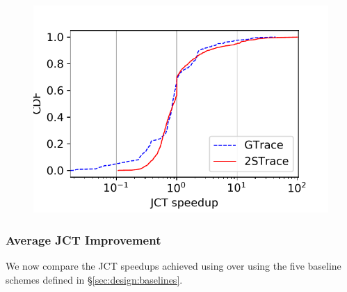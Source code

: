 \begin{figure}
\includegraphics[width=0.9\linewidth]{figures/testbed/testbedBothTracesSpeedupCDF-speedUp-CDF.pdf}
\label{fig:testbed:speedup:cdf}
\end{figure}

\subsubsection{Average JCT Improvement}
\label{sec:sim:averageJCT}

We now compare the JCT speedups achieved using \slearn over using the
five baseline schemes defined in \S\ref{sec:design:baselines}.


